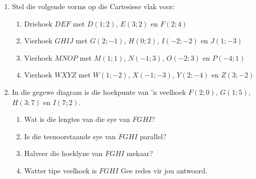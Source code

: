 \begin{eocexercises}{}
\begin{enumerate}[noitemsep, label=\textbf{\arabic*}. ] 
\item 
Stel die volgende vorms op die Cartesiese vlak voor: 
    \begin{enumerate}[noitemsep, label=\textbf{\alph*}. ] 
    \item Driehoek $DEF$ met $D(1;2)$, $E(3;2)$ en $F(2;4)$ 
    \item Vierhoek $GHIJ$ met $G(2;-1)$, $H(0;2)$, $I(-2;-2)$ en $J(1;-3)$
    \item Vierhoek $MNOP$ met $M(1;1)$, $N(-1;3)$, $O(-2;3)$ en $P(-4;1)$ 
    \item Vierhoek $WXYZ$ met $W(1;-2)$, $X(-1;-3)$, $Y(2;-4)$ en $Z(3;-2)$
    \end{enumerate}
\item 
In die gegewe diagram is die hoekpunte van ’n veelhoek $F(2;0)$, $G(1;5)$, $H(3;7)$ en $I(7;2)$.
\setcounter{subfigure}{0}
\begin{figure}[H] %
\begin{center}
\end{center}
\end{figure}  
    \begin{enumerate}[noitemsep, label=\textbf{\alph*}. ] 
    \item 
    Wat is die lengtes van die sye van $FGHI$?
    \item Is die teenoorstaande sye van $FGHI$ parallel?
    \item Halveer die hoeklyne van $FGHI$ mekaar?
    \item Watter tipe veelhoek is  $FGHI$ Gee redes vir jou antwoord.
    \end{enumerate}

\end{enumerate}
\end{eocexercises}
